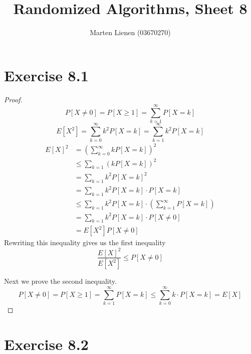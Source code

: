 \documentclass[10pt,a4paper]{article}
\title{Randomized Algorithms, Sheet 8}
\author{Marten Lienen (03670270)}
\begin{document}
\maketitle

\section*{Exercise 8.1}

\begin{proof}
  \begin{equation*}
    P[X \ne 0] = P[X \ge 1] = \sum_{k = 1}^{\infty} P[X = k]
  \end{equation*}
  \begin{equation*}
    E[X^{2}] = \sum_{k = 0}^{\infty} k^{2} P[X = k] = \sum_{k = 1}^{\infty} k^{2} P[X = k]
  \end{equation*}
  \begin{align*}
    E[X]^{2} & = \left( \sum_{k = 0}^{\infty} k P[X = k] \right)^{2}\\
             & \le \sum_{k = 1} \left( k P[X = k] \right)^{2}\\
             & = \sum_{k = 1} k^{2} P[X = k]^{2}\\
             & = \sum_{k = 1} k^{2} P[X = k] \cdot P[X = k]\\
             & \le \sum_{k = 1} k^{2} P[X = k] \cdot \left( \sum_{k = 1}^{\infty} P[X = k] \right)\\
             & = \sum_{k = 1} k^{2} P[X = k] \cdot P[X \ne 0]\\
             & = E[X^{2}] P[X \ne 0]
  \end{align*}
  Rewriting this inequality gives us the first inequality
  \begin{equation*}
    \frac{E[X]^{2}}{E[X^{2}]} \le P[X \ne 0]
  \end{equation*}

  Next we prove the second inequality.
  \begin{equation*}
    P[X \ne 0] = P[X \ge 1] = \sum_{k = 1}^{\infty} P[X = k] \le \sum_{k = 0}^{\infty} k \cdot P[X = k] = E[X]
  \end{equation*}
\end{proof}

\section*{Exercise 8.2}
\end{document}
